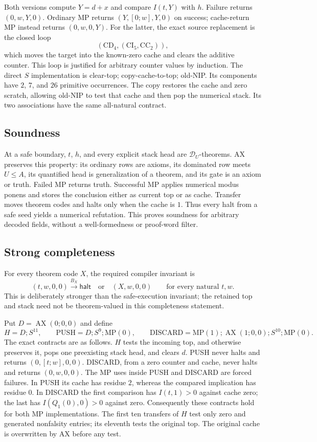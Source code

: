 Both versions compute $Y=d+x$ and compare $I(t,Y)$ with $h$.  Failure
returns $(0,w,Y,0)$.  Ordinary MP returns $(Y,[0;w],Y,0)$ on success;
cache-return MP instead returns $(0,w,0,Y)$.  For the latter, the exact
source replacement is the closed loop
\[
 (\mathrm{CD}_4,(\mathrm{CI}_5,\mathrm{CC}_2)),
\]
which moves the target into the known-zero cache and clears the additive
counter.  This loop is justified for arbitrary counter values by induction.
The direct $S$ implementation is clear-top; copy-cache-to-top; old-NIP.
Its components have $2$, $7$, and $26$ primitive occurrences.  The copy
restores the cache and zero scratch, allowing old-NIP to test that cache
and then pop the numerical stack.  Its two associations have the same
all-natural contract.

\subsection{Soundness}

At a safe boundary, $t$, $h$, and every explicit stack head are
$\mathcal D_U$-theorems.  AX preserves this property: its ordinary rows
are axioms, its dominated row meets $U\le A$, its quantified head is
generalization of a theorem, and its gate is an axiom or truth.  Failed
MP returns truth.  Successful MP applies numerical modus ponens and stores
the conclusion either as current top or as cache.  Transfer moves theorem
codes and halts only when the cache is $1$.  Thus every halt from a safe
seed yields a numerical refutation.  This proves soundness for arbitrary
decoded fields, without a well-formedness or proof-word filter.

\subsection{Strong completeness}

For every theorem code $X$, the required compiler invariant is
\[
 (t,w,0,0)\xrightarrow{B_X}\mathsf{halt}
 \quad\text{or}\quad (X,w,0,0)
 \qquad\text{for every natural }t,w.
\]
This is deliberately stronger than the safe-execution invariant; the
retained top and stack need not be theorem-valued in this completeness
statement.

Put $D=\operatorname{AX}(0;0,0)$ and define
\[
 H=D;S^{11},\qquad
 \mathrm{PUSH}=D;S^9;\mathrm{MP}(0),\qquad
 \mathrm{DISCARD}=\mathrm{MP}(1);\operatorname{AX}(1;0,0);S^{10};\mathrm{MP}(0).
\]
The exact contracts are as follows.  $H$ tests the incoming top, and
otherwise preserves it, pops one preexisting stack head, and clears $d$.
PUSH never halts and returns $(0,[t;w],0,0)$.  DISCARD, from a zero
counter and cache, never halts and returns $(0,w,0,0)$.
The MP uses inside PUSH and DISCARD are forced failures.  In PUSH its
cache has residue $2$, whereas the compared implication has residue $0$.
In DISCARD the first comparison has $I(t,1)>0$ against cache zero;
the last has $I(Q_1(0),0)>0$ against zero.  Consequently these contracts
hold for both MP implementations.  The first ten transfers of $H$ test
only zero and generated nonfalsity entries; its eleventh tests the
original top.  The original cache is overwritten by AX before any test.

